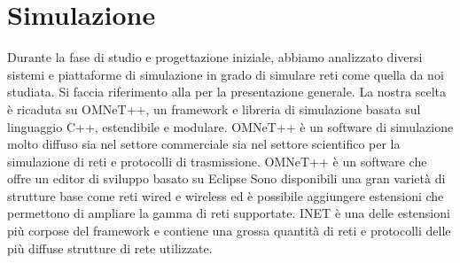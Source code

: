 \section{Simulazione}
Durante la fase di studio e progettazione iniziale, abbiamo analizzato diversi sistemi e piattaforme di simulazione in grado di simulare reti come quella da noi studiata. Si faccia riferimento alla  per la presentazione generale. La nostra scelta è ricaduta su OMNeT++, un framework e libreria di simulazione basata sul linguaggio C++, estendibile e modulare. OMNeT++ è un software di simulazione molto diffuso sia nel settore commerciale sia nel settore scientifico per la simulazione di reti e protocolli di trasmissione. OMNeT++ è un software che offre un editor di sviluppo basato su Eclipse Sono disponibili una gran varietà di strutture base come reti wired e wireless ed è possibile aggiungere estensioni che permettono di ampliare la gamma di reti supportate. INET è una delle estensioni più corpose del framework e contiene una grossa quantità di reti e protocolli delle più diffuse strutture di rete utilizzate.


